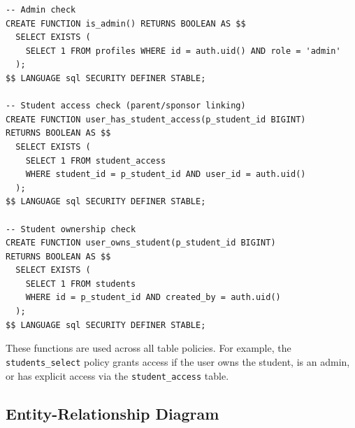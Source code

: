 \documentclass[12pt,a4paper]{article}
\begin{document}
\begin{lstlisting}[style=sql, caption={RLS helper functions}]
-- Admin check
CREATE FUNCTION is_admin() RETURNS BOOLEAN AS $$
  SELECT EXISTS (
    SELECT 1 FROM profiles WHERE id = auth.uid() AND role = 'admin'
  );
$$ LANGUAGE sql SECURITY DEFINER STABLE;

-- Student access check (parent/sponsor linking)
CREATE FUNCTION user_has_student_access(p_student_id BIGINT)
RETURNS BOOLEAN AS $$
  SELECT EXISTS (
    SELECT 1 FROM student_access
    WHERE student_id = p_student_id AND user_id = auth.uid()
  );
$$ LANGUAGE sql SECURITY DEFINER STABLE;

-- Student ownership check
CREATE FUNCTION user_owns_student(p_student_id BIGINT)
RETURNS BOOLEAN AS $$
  SELECT EXISTS (
    SELECT 1 FROM students
    WHERE id = p_student_id AND created_by = auth.uid()
  );
$$ LANGUAGE sql SECURITY DEFINER STABLE;
\end{lstlisting}

These functions are used across all table policies. For example, the \texttt{students\_select} policy grants access if the user owns the student, is an admin, or has explicit access via the \texttt{student\_access} table.

\subsection{Entity-Relationship Diagram}
\end{document}

